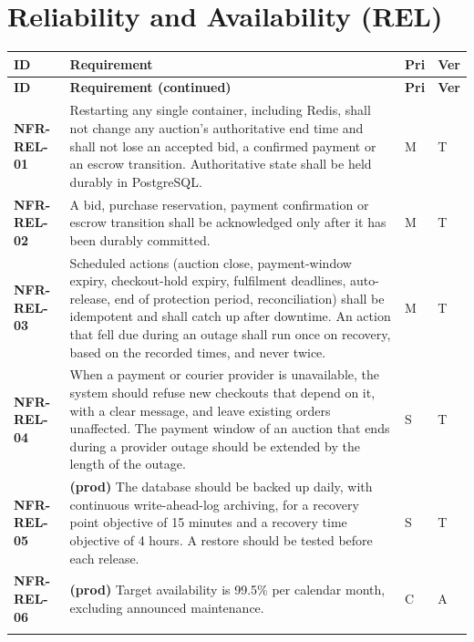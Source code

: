 \documentclass[11pt,a4paper]{report}
\makeatletter
\newenvironment{reqs}{%
  \small
  \begin{longtable}{@{}>{\raggedright\arraybackslash}p{2.35cm}
                       >{\raggedright\arraybackslash}p{10.3cm}
                       >{\centering\arraybackslash}p{0.7cm}
                       >{\centering\arraybackslash}p{0.7cm}@{}}
  \toprule
  \textbf{ID} & \textbf{Requirement} & \textbf{Pri} & \textbf{Ver} \\
  \midrule
  \endfirsthead
  \toprule
  \textbf{ID} & \textbf{Requirement (continued)} & \textbf{Pri} & \textbf{Ver} \\
  \midrule
  \endhead
  \bottomrule
  \endfoot
}{\end{longtable}}
\newcommand{\req}[5]{\leavevmode\textbf{#1}\hypertarget{#1}{} & #5 & #2 & #3 \\ \addlinespace[2pt]}
\makeatother
\begin{document}
\section{Reliability and Availability (REL)}
\begin{reqs}
\req{NFR-REL-01}{M}{T}{NFR-11}{Restarting any single container, including Redis, shall not change any auction's authoritative end time and shall not lose an accepted bid, a confirmed payment or an escrow transition. Authoritative state shall be held durably in PostgreSQL.}
\req{NFR-REL-02}{M}{T}{new}{A bid, purchase reservation, payment confirmation or escrow transition shall be acknowledged only after it has been durably committed.}
\req{NFR-REL-03}{M}{T}{new}{Scheduled actions (auction close, payment-window expiry, checkout-hold expiry, fulfilment deadlines, auto-release, end of protection period, reconciliation) shall be idempotent and shall catch up after downtime. An action that fell due during an outage shall run once on recovery, based on the recorded times, and never twice.}
\req{NFR-REL-04}{S}{T}{new}{When a payment or courier provider is unavailable, the system should refuse new checkouts that depend on it, with a clear message, and leave existing orders unaffected. The payment window of an auction that ends during a provider outage should be extended by the length of the outage.}
\req{NFR-REL-05}{S}{T}{new}{\textbf{(prod)} The database should be backed up daily, with continuous write-ahead-log archiving, for a recovery point objective of 15 minutes and a recovery time objective of 4 hours. A restore should be tested before each release.}
\req{NFR-REL-06}{C}{A}{new}{\textbf{(prod)} Target availability is 99.5\% per calendar month, excluding announced maintenance.}
\end{reqs}
\end{document}
